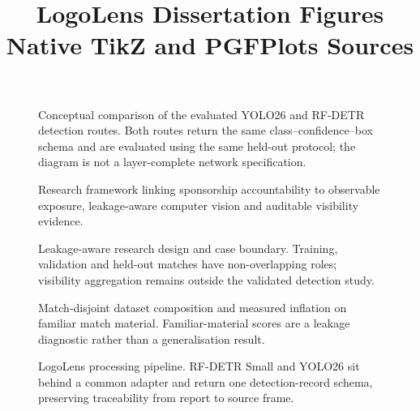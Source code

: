 \documentclass[10pt,a4paper]{article}
\title{LogoLens Dissertation Figures\\\large Native TikZ and PGFPlots Sources}
\author{}
\date{}
\begin{document}
\maketitle
\listoffigures
\clearpage

\begin{figure}[p]
  \centering
  \resizebox{\textwidth}{!}{}
  \caption[YOLO26 and RF-DETR conceptual architecture]{Conceptual comparison of
  the evaluated YOLO26 and RF-DETR detection routes. Both routes return the same
  class--confidence--box schema and are evaluated using the same held-out
  protocol; the diagram is not a layer-complete network specification.}
  \label{fig:yolo-rfdetr-tikz}
\end{figure}
\clearpage

\begin{figure}[p]
  \centering
  \resizebox{0.96\textwidth}{!}{}
  \caption[Research framework]{Research framework linking sponsorship
  accountability to observable exposure, leakage-aware computer vision and
  auditable visibility evidence.}
  \label{fig:framework-tikz}
\end{figure}
\clearpage

\begin{figure}[p]
  \centering
  \resizebox{\textwidth}{!}{}
  \caption[Research design and case boundary]{Leakage-aware research design and
  case boundary. Training, validation and held-out matches have non-overlapping
  roles; visibility aggregation remains outside the validated detection study.}
  \label{fig:design-tikz}
\end{figure}
\clearpage

\begin{figure}[p]
  \centering
  
  \caption[Dataset split and temporal leakage]{Match-disjoint dataset composition
  and measured inflation on familiar match material. Familiar-material scores are
  a leakage diagnostic rather than a generalisation result.}
  \label{fig:split-leakage-pgf}
\end{figure}
\clearpage

\begin{figure}[p]
  \centering
  \resizebox{\textwidth}{!}{}
  \caption[LogoLens system architecture]{LogoLens processing pipeline. RF-DETR
  Small and YOLO26 sit behind a common adapter and return one detection-record
  schema, preserving traceability from report to source frame.}
  \label{fig:system-tikz}
\end{figure}
\clearpage
\end{document}
